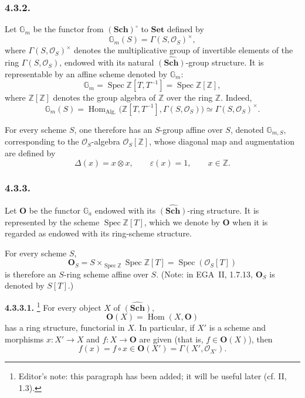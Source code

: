 \subsubsection*{4.3.2.}

Let \(\mathbb G_m\) be the functor from \((\mathbf{Sch})^{\circ}\) to
\(\mathbf{Set}\) defined by
\[
  \mathbb G_m(S)=\Gamma(S,\mathcal O_S)^{\times},
\]
where \(\Gamma(S,\mathcal O_S)^{\times}\) denotes the multiplicative
group of invertible elements of the ring \(\Gamma(S,\mathcal O_S)\),
endowed with its natural \(\widehat{(\mathbf{Sch})}\)-group structure.
It is representable by an affine scheme denoted by \(\mathbb G_m\):
\[
  \mathbb G_m
    =\operatorname{Spec}\mathbb Z[T,T^{-1}]
    =\operatorname{Spec}\mathbb Z[\mathbb Z],
\]
where \(\mathbb Z[\mathbb Z]\) denotes the group algebra of \(\mathbb Z\)
over the ring \(\mathbb Z\). Indeed,
\[
  \mathbb G_m(S)
    =\operatorname{Hom}_{\mathrm{Alg.}}
       \bigl(\mathbb Z[T,T^{-1}],\Gamma(S,\mathcal O_S)\bigr)
    \simeq\Gamma(S,\mathcal O_S)^{\times}.
\]

For every scheme \(S\), one therefore has an \(S\)-group affine over
\(S\), denoted \(\mathbb G_{m,S}\), corresponding to the
\(\mathcal O_S\)-algebra \(\mathcal O_S[\mathbb Z]\), whose diagonal map
and augmentation are defined by
\[
  \Delta(x)=x\otimes x,
  \qquad
  \varepsilon(x)=1,
  \qquad x\in\mathbb Z.
\]

\subsubsection*{4.3.3.}

Let \(\mathbf O\) be the functor \(\mathbb G_a\) endowed with its
\(\widehat{(\mathbf{Sch})}\)-ring structure. It is represented by the
scheme \(\operatorname{Spec}\mathbb Z[T]\), which we denote by
\(\mathbf O\) when it is regarded as endowed with its ring-scheme
structure.

For every scheme \(S\),
\[
  \mathbf O_S
    =S\times_{\operatorname{Spec}\mathbb Z}
       \operatorname{Spec}\mathbb Z[T]
    =\operatorname{Spec}(\mathcal O_S[T])
\]
is therefore an \(S\)-ring scheme affine over \(S\). (Note: in EGA~II,
1.7.13, \(\mathbf O_S\) is denoted by \(S[T]\).)

\medskip
\noindent\textbf{4.3.3.1.}
\footnote{Editor's note: this paragraph has been added; it will be useful
later (cf. II, 1.3).}
For every object \(X\) of \(\widehat{(\mathbf{Sch})}\),
\[
  \mathbf O(X)=\operatorname{Hom}(X,\mathbf O)
\]
has a ring structure, functorial in \(X\). In particular, if \(X'\) is a
scheme and morphisms \(x:X'\to X\) and \(f:X\to\mathbf O\) are given
(that is, \(f\in\mathbf O(X)\)), then
\[
  f(x)=f\circ x
    \in\mathbf O(X')
    =\Gamma(X',\mathcal O_{X'}).
\]

